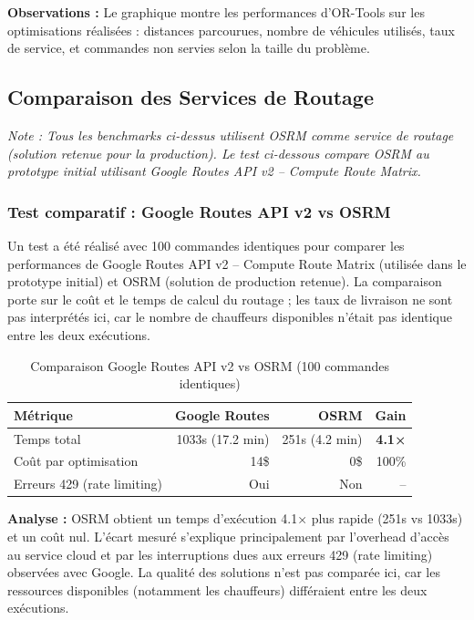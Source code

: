 \documentclass[12pt,a4paper]{report}
\begin{document}
\textbf{Observations :} Le graphique montre les performances d'OR-Tools sur les optimisations réalisées : distances parcourues, nombre de véhicules utilisés, taux de service, et commandes non servies selon la taille du problème.


\subsection{Comparaison des Services de Routage}

\textit{Note : Tous les benchmarks ci-dessus utilisent OSRM comme service de routage (solution retenue pour la production). Le test ci-dessous compare OSRM au prototype initial utilisant Google Routes API v2 -- Compute Route Matrix.}

\subsubsection{Test comparatif : Google Routes API v2 vs OSRM}

Un test a été réalisé avec 100 commandes identiques pour comparer les performances de Google Routes API v2 -- Compute Route Matrix (utilisée dans le prototype initial) et OSRM (solution de production retenue). La comparaison porte sur le coût et le temps de calcul du routage ; les taux de livraison ne sont pas interprétés ici, car le nombre de chauffeurs disponibles n'était pas identique entre les deux exécutions.

\begin{table}[H]
\centering
\begin{tabular}{lrrr}
\toprule
\textbf{Métrique} & \textbf{Google Routes} & \textbf{OSRM} & \textbf{Gain} \\
\midrule
Temps total        & 1033s (17.2 min) & 251s (4.2 min) & \textbf{4.1×} \\
Coût par optimisation & 14\$          & 0\$            & 100\% \\
Erreurs 429 (rate limiting) & Oui    & Non            & -- \\
\bottomrule
\end{tabular}
\caption{Comparaison Google Routes API v2 vs OSRM (100 commandes identiques)}
\label{tab:benchmark-google-osrm}
\end{table}

\textbf{Analyse :} OSRM obtient un temps d'exécution 4.1× plus rapide (251s vs 1033s) et un coût nul. L'écart mesuré s'explique principalement par l'overhead d'accès au service cloud et par les interruptions dues aux erreurs 429 (rate limiting) observées avec Google. La qualité des solutions n'est pas comparée ici, car les ressources disponibles (notamment les chauffeurs) différaient entre les deux exécutions.
\end{document}
